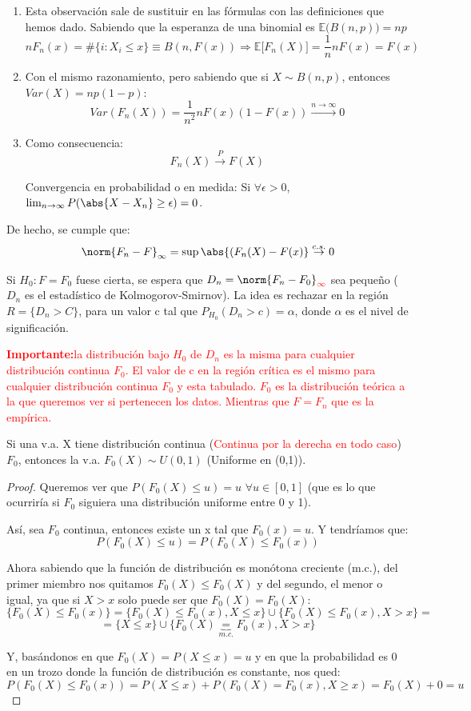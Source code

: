 \documentclass[nochap]{apuntes}
\begin{document}
\begin{obs}
\begin{enumerate}
\item Esta observación sale de sustituir en las fórmulas con las definiciones que hemos dado. Sabiendo que la esperanza de una binomial es $\mathbb{E}\Big(B(n,p)\Big)=np$ $$nF_n(x) = \#\{i:X_i\leq x \} \equiv B(n, F(x))  \Rightarrow \mathbb{E}\Big[F_n(X)\Big] = \frac{1}{n} n F(x) = F(x)$$
\item Con el mismo razonamiento, pero sabiendo que si $X \sim B(n,p)$, entonces $Var(X)=np(1-p)$:
$$ Var(F_n(X))=\frac{1}{n^2}nF(x)(1-F(x)) \stackrel{n \rightarrow \infty}{\rightarrow} 0$$
\item Como consecuencia:
$$ F_n(X) \stackrel{P}{\rightarrow} F(X)$$

Convergencia en probabilidad o en medida: Si $\forall \epsilon >0$, $\lim_{n \rightarrow \infty}P(\abs{X-X_n}\geq \epsilon)=0$.
\end{enumerate}
\end{obs}
De hecho, se cumple que:
$$\norm{F_n-F}_{\infty} = \sup\abs{(F_n(X)-F(x)} \stackrel{c.s.}{\rightarrow} 0$$

Si $H_0: F=F_0$ fuese cierta, se espera que $D_n = \norm{F_n-F_0}_{\textcolor{red}{\infty}}$ sea pequeño ($D_n$ es el estadístico de Kolmogorov-Smirnov). La idea es rechazar en la región $R=\{D_n > C\}$, para un valor c tal que $P_{H_0}(D_n > c)=\alpha$, donde $\alpha$ es el nivel de significación.

\textcolor{red}{\textbf{Importante:}la distribución bajo $H_0$ de $D_n$ es la misma para cualquier distribución continua $F_0$. El valor de c en la región crítica es el mismo para cualquier distribución continua $F_0$ y esta tabulado. $F_0$ es la distribución teórica a la que queremos ver si pertenecen los datos. Mientras que $F=F_n$ que es la empírica.}

\begin{prop}
Si una v.a. X tiene distribución continua (\textcolor{red}{Continua por la derecha en todo caso}) $F_0$, entonces la v.a. $F_0(X) \sim U(0,1)$ (Uniforme en (0,1)).
\end{prop}
\begin{proof}
Queremos ver que $P(F_0(X)\leq u)=u$ $\forall u \in [0,1]$ (que es lo que ocurriría si $F_0$ siguiera una distribución uniforme entre 0 y 1).

Así, sea $F_0$ continua, entonces existe un x tal que $F_0(x)=u$. Y tendríamos que:
$$ P(F_0(X)\leq u) = P(F_0(X)\leq F_0(x)) $$

Ahora sabiendo que la función de distribución es monótona creciente (m.c.), del primer miembro nos quitamos $F_0(X)\leq F_0(X)$ y del segundo, el menor o igual, ya que si $X>x$ solo puede ser que $F_0(X)= F_0(X)$:
$$\{ F_0(X)\leq F_0(x) \} = \{ F_0(X)\leq F_0(x), X \leq x\} \cup \{ F_0(X)\leq F_0(x), X > x\} = $$
$$ =  \{ X \leq x\} \cup \{ F_0(X) \underbrace{=}_{m.c.} F_0(x), X > x\}$$

Y, basándonos en que $F_0(X)=P(X \leq x)=u$ y en que la probabilidad es 0 en un trozo donde la función de distribución es constante, nos qued: 
$$P(F_0(X)\leq F_0(x)) = P(X \leq x) + P(F_0(X) = F_0(x), X \geq x) = F_0(X) + 0 = u$$
\end{proof}
\end{document}
